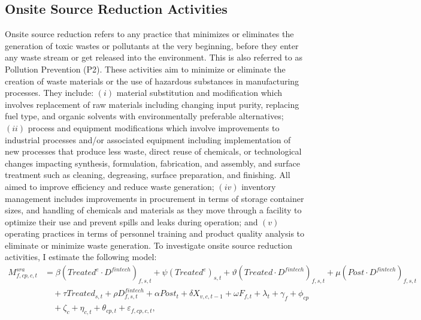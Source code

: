 \documentclass[12pt, english]{article}
\begin{document}
    \subsection{Onsite Source Reduction Activities}\label{subsec:onsite-source-reduction-activities}
    Onsite source reduction refers to any practice that minimizes or eliminates the generation of toxic wastes or pollutants at the very beginning, before they enter any waste stream or get released into the environment. This is also referred to as Pollution Prevention (P2). These activities aim to minimize or eliminate the creation of waste materials or the use of hazardous substances in manufacturing processes. They include: $(i)$ material substitution and modification which involves replacement of raw materials including changing input purity, replacing fuel type, and organic solvents with environmentally preferable alternatives; $(ii)$ process and equipment modifications which involve improvements to industrial processes and/or associated equipment including implementation of new processes that produce less waste, direct reuse of chemicals, or technological changes impacting synthesis, formulation, fabrication, and assembly, and surface treatment such as cleaning, degreasing, surface preparation, and finishing. All aimed to improve efficiency and reduce waste generation; $(iv)$ inventory management includes improvements in procurement in terms of storage container sizes, and handling of chemicals and materials as they move through a facility to optimize their use and prevent spills and leaks during operation; and $(v)$ operating practices in terms of personnel training and product quality analysis to eliminate or minimize waste generation. To investigate onsite source reduction activities, I estimate the following model:
    \begin{align}
        M_{f,cp,c,t}^{sra} &= \beta (Treated^{e} \cdot D^{fintech})_{f,s,t} + \psi (Treated^{e})_{s,t} + \vartheta (Treated \cdot D^{fintech})_{f,s,t} + \mu (Post \cdot D^{fintech})_{f,s,t} \nonumber \\
        &\quad + \tau Treated_{s,t} + \rho D_{f,s,t}^{fintech} + \alpha Post_{t} + \delta X_{v,c,t-1} + \omega F_{f,t} + \lambda_{t} + \gamma_{f} + \phi_{cp} \nonumber \\
        &\quad + \zeta_{c} + \eta_{c,t} + \theta_{cp,t} + \varepsilon_{f,cp,c,t},\label{eq:mechanisms-source-reduction}
    \end{align}
\end{document}
